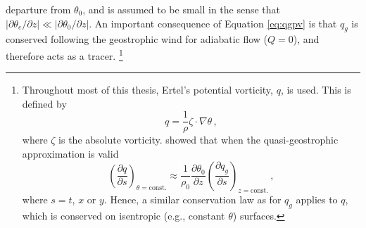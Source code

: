 departure from $\theta_0$, and is assumed to be small in the sense that
$|\partial\theta_e/\partial z| \ll |\partial\theta_0/\partial z|$. An important
consequence of Equation \ref{eq:qgpv} is that $q_g$ is conserved following the
geostrophic wind for adiabatic flow ($Q=0$), and therefore acts as a tracer.
\footnote{Throughout most of this thesis, Ertel's potential vorticity, $q$,
  is used. This is defined by
\begin{equation*}
  q = \frac{1}{\rho}\zeta\cdot\nabla\theta \, , 
\end{equation*}
where
$\zeta$ is the absolute vorticity. \citet{Charney1962} showed that when the
quasi-geostrophic approximation is valid
\begin{equation*}
\left(\frac{\partial q}{\partial s}\right)_{\theta=\mathrm{const.}} \approx
\frac{1}{\rho_0}\frac{\partial \theta_0}{\partial z}\left(\frac{\partial
    q_g}{\partial s}\right)_{z=\mathrm{const.}} \, ,
\end{equation*}
where $s = t$, $x$ or $y$. Hence, a similar conservation law as for
$q_g$ applies to $q$, which is conserved on isentropic (e.g., constant
$\theta$) surfaces.  }

